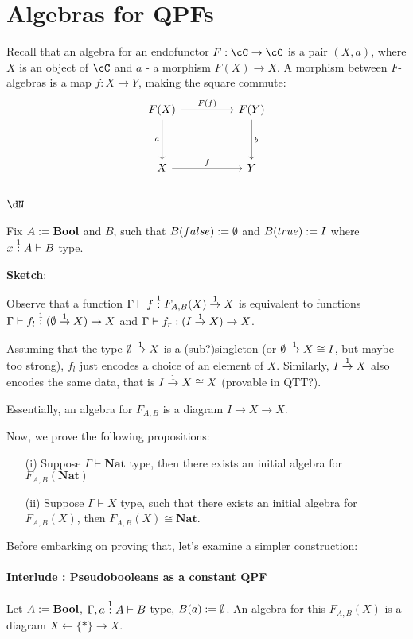 \documentclass[12pt,a4paper]{article}
\begin{document}
\section{Algebras for QPFs}
Recall that an algebra for an endofunctor $F : \cC \to \cC$ is a pair $(X, a)$, where $X$ is an object of $\cC$ and $a$ - a morphism $F(X) \to X$. A morphism between $F$-algebras is a map $f : X \to Y$, making the square commute:
$$
\begin{tikzcd}
  F(X) \arrow[dd, "a"'] \arrow[rr, "F(f)"] &  & F(Y) \arrow[dd, "b"] \\
  &  &                      \\
  X \arrow[rr, "f"]                        &  & Y                   
\end{tikzcd}
$$

\subsection{$\dN$}
Fix $A := \mathbf{Bool}$ and $B$, such that $B(false) := \emptyset$ and $B(true) := I$ where $x \overset{1}{:} A \vdash B$ type.

\textbf{Sketch}:

Observe that a function $\Gamma \vdash f\overset{1}{:} F_{A,B}(X) \overset{1}{\to} X$ is equivalent to functions $\Gamma \vdash f_l \overset{1}{:} (\emptyset \overset{1}{\to} X) \to X$ and $\Gamma \vdash f_r : (I \overset{1}{\to} X) \to X$.

Assuming that the type $\emptyset \overset{1}{\to} X$ is a (sub?)singleton (or $\emptyset \overset{1}{\to} X \cong I$, but maybe too strong), $f_l$ just encodes a choice of an element of $X$. Similarly, $I\overset{1}{\to} X$ also encodes the same data, that is $ I \overset{1}{\to} X \cong X$ (provable in QTT?).

Essentially, an algebra for $F_{A,B}$ is a diagram $I \to X \to X$.\

Now, we prove the following propositions:
\begin{enumerate}
  \item[(i)] Suppose $\Gamma \vdash \mathbf{Nat}$ type, then there exists an initial algebra for $F_{A,B}(\mathbf{Nat})$
  \item[(ii)]  Suppose $\Gamma \vdash X$ type, such that there exists an initial algebra for $F_{A,B}(X)$, then $F_{A,B}(X) \cong \mathbf{Nat}$.
\end{enumerate}

Before embarking on proving that, let's examine a simpler construction:
\paragraph{Interlude : Pseudobooleans as a constant QPF}
Let $A := \mathbf{Bool}$, $\Gamma, a \overset{1}{:} A \vdash B$ type, $B(a) := \emptyset$.
An algebra for this $F_{A,B}(X)$ is a diagram $X \leftarrow \{ * \} \to X$.\\
\end{document}
